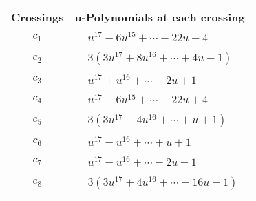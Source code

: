\documentclass[1p]{elsarticle_modified}
\theoremstyle{definition}
\begin{document}
\begin{tabular}{m{50pt}|m{274pt}}
Crossings & \hspace{64pt}u-Polynomials at each crossing \\
\hline $$\begin{aligned}c_{1}\end{aligned}$$&$\begin{aligned}
&u^{17}-6 u^{15}+\cdots-22 u-4
\end{aligned}$\\
\hline $$\begin{aligned}c_{2}\end{aligned}$$&$\begin{aligned}
&3(3 u^{17}+8 u^{16}+\cdots+4 u-1)
\end{aligned}$\\
\hline $$\begin{aligned}c_{3}\end{aligned}$$&$\begin{aligned}
&u^{17}+u^{16}+\cdots-2 u+1
\end{aligned}$\\
\hline $$\begin{aligned}c_{4}\end{aligned}$$&$\begin{aligned}
&u^{17}-6 u^{15}+\cdots-22 u+4
\end{aligned}$\\
\hline $$\begin{aligned}c_{5}\end{aligned}$$&$\begin{aligned}
&3(3 u^{17}-4 u^{16}+\cdots+u+1)
\end{aligned}$\\
\hline $$\begin{aligned}c_{6}\end{aligned}$$&$\begin{aligned}
&u^{17}- u^{16}+\cdots+u+1
\end{aligned}$\\
\hline $$\begin{aligned}c_{7}\end{aligned}$$&$\begin{aligned}
&u^{17}- u^{16}+\cdots-2 u-1
\end{aligned}$\\
\hline $$\begin{aligned}c_{8}\end{aligned}$$&$\begin{aligned}
&3(3 u^{17}+4 u^{16}+\cdots-16 u-1)
\end{aligned}$\\

\end{tabular}
\end{document}
